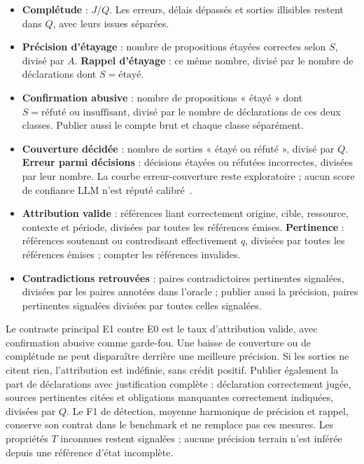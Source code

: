 \documentclass[11pt,a4paper]{article}
\begin{document}
\begin{itemize}
\item \textbf{Complétude} : $J/Q$. Les erreurs, délais dépassés et sorties
illisibles restent dans $Q$, avec leurs issues séparées.
\item \textbf{Précision d'étayage} : nombre de propositions étayées correctes
selon $S$, divisé par $A$. \textbf{Rappel d'étayage} : ce même nombre, divisé
par le nombre de déclarations dont $S=\text{étayé}$.
\item \textbf{Confirmation abusive} : nombre de propositions « étayé » dont
$S=\text{réfuté ou insuffisant}$, divisé par le nombre de déclarations de ces
deux classes. Publier aussi le compte brut et chaque classe séparément.
\item \textbf{Couverture décidée} : nombre de sorties « étayé ou réfuté »,
divisé par $Q$. \textbf{Erreur parmi décisions} : décisions étayées ou réfutées
incorrectes, divisées par leur nombre. La courbe erreur-couverture reste
exploratoire ; aucun score de confiance LLM n'est réputé calibré~\cite{selective}.
\item \textbf{Attribution valide} : références liant correctement origine,
cible, ressource, contexte et période, divisées par toutes les références
émises. \textbf{Pertinence} : références soutenant ou contredisant effectivement
$q$, divisées par toutes les références émises ; compter les références invalides.
\item \textbf{Contradictions retrouvées} : paires contradictoires pertinentes
signalées, divisées par les paires annotées dans l'oracle ; publier aussi la
précision, paires pertinentes signalées divisées par toutes celles signalées.
\end{itemize}

Le contraste principal E1 contre E0 est le taux d'attribution valide, avec
confirmation abusive comme garde-fou. Une baisse de couverture ou de complétude
ne peut disparaître derrière une meilleure précision. Si les sorties ne citent
rien, l'attribution est indéfinie, sans crédit positif. Publier également la part
de déclarations avec justification complète : déclaration correctement jugée,
sources pertinentes citées et obligations manquantes correctement indiquées,
divisées par $Q$. Le F1 de détection, moyenne harmonique de précision et rappel,
conserve son contrat dans le benchmark et ne
remplace pas ces mesures. Les propriétés $T$ inconnues restent signalées ; aucune
précision terrain n'est inférée depuis une référence d'état incomplète.
\end{document}
